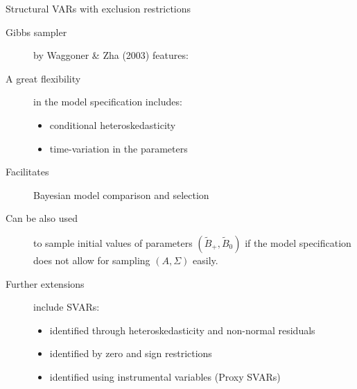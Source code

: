 \documentclass[notes,blackandwhite,mathsans,usenames,dvipsnames]{beamer}
\begin{document}
\begin{frame}{Structural VARs with exclusion restrictions}
\begin{description}
\item[Gibbs sampler] {\color{mcxs2}by} Waggoner \& Zha (2003) {\color{mcxs2}features:}
\item[A great flexibility] {\color{mcxs2}in the model specification includes:}
	\begin{itemize}[label=\textbullet,leftmargin = *]
	\item {\color{mcxs2}conditional heteroskedasticity}
	\item {\color{mcxs2}time-variation in the parameters}
	\end{itemize}
\item[Facilitates] {\color{mcxs2} Bayesian model comparison and selection}
	
\item[Can be also used] {\color{mcxs2}to sample initial values of parameters} $(\tilde{B}_+,\tilde{B}_0)$ {\color{mcxs2}if the model specification does not allow for sampling} $(A,\Sigma)$ {\color{mcxs2}easily.}

\item[Further extensions] {\color{mcxs2}include SVARs:}
	\begin{itemize}[label=\textbullet,leftmargin = *]
	\item {\color{purple}identified through heteroskedasticity} {\color{mcxs2}and non-normal residuals}
	\item {\color{mcxs2}identified by zero and sign restrictions}
	\item {\color{mcxs2}identified using instrumental variables (Proxy SVARs)}
	\end{itemize}
\end{description}

\end{frame}
\end{document}
